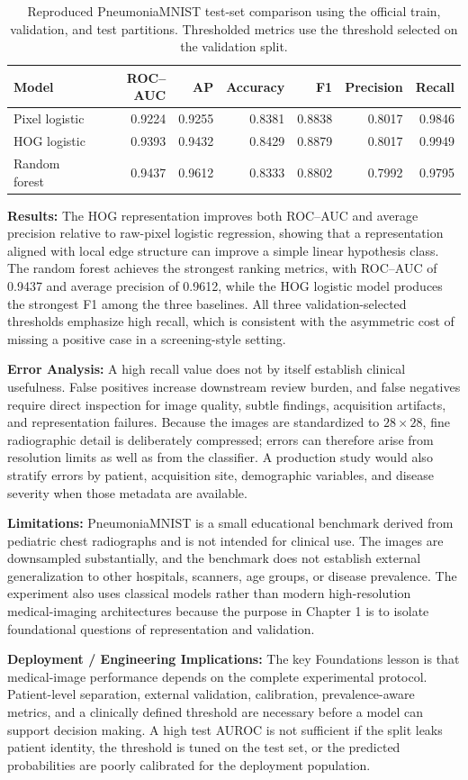 \begin{table}[t]
\centering
\small
\caption{Reproduced PneumoniaMNIST test-set comparison using the official train, validation, and test partitions. Thresholded metrics use the threshold selected on the validation split.}
\label{tab:ch1-medical-pneumonia-benchmark}
\begin{tabular}{lrrrrrr}
\toprule
Model & ROC--AUC & AP & Accuracy & F1 & Precision & Recall \\
\midrule
Pixel logistic & 0.9224 & 0.9255 & 0.8381 & 0.8838 & 0.8017 & 0.9846 \\
HOG logistic & 0.9393 & 0.9432 & 0.8429 & 0.8879 & 0.8017 & 0.9949 \\
Random forest & 0.9437 & 0.9612 & 0.8333 & 0.8802 & 0.7992 & 0.9795 \\
\bottomrule
\end{tabular}
\end{table}

\textbf{Results:} The HOG representation improves both ROC--AUC and average precision relative to raw-pixel logistic regression, showing that a representation aligned with local edge structure can improve a simple linear hypothesis class. The random forest achieves the strongest ranking metrics, with ROC--AUC of 0.9437 and average precision of 0.9612, while the HOG logistic model produces the strongest F1 among the three baselines. All three validation-selected thresholds emphasize high recall, which is consistent with the asymmetric cost of missing a positive case in a screening-style setting.

\textbf{Error Analysis:} A high recall value does not by itself establish clinical usefulness. False positives increase downstream review burden, and false negatives require direct inspection for image quality, subtle findings, acquisition artifacts, and representation failures. Because the images are standardized to \(28\times 28\), fine radiographic detail is deliberately compressed; errors can therefore arise from resolution limits as well as from the classifier. A production study would also stratify errors by patient, acquisition site, demographic variables, and disease severity when those metadata are available.

\textbf{Limitations:} PneumoniaMNIST is a small educational benchmark derived from pediatric chest radiographs and is not intended for clinical use. The images are downsampled substantially, and the benchmark does not establish external generalization to other hospitals, scanners, age groups, or disease prevalence. The experiment also uses classical models rather than modern high-resolution medical-imaging architectures because the purpose in Chapter 1 is to isolate foundational questions of representation and validation.

\textbf{Deployment / Engineering Implications:} The key Foundations lesson is that medical-image performance depends on the complete experimental protocol. Patient-level separation, external validation, calibration, prevalence-aware metrics, and a clinically defined threshold are necessary before a model can support decision making. A high test AUROC is not sufficient if the split leaks patient identity, the threshold is tuned on the test set, or the predicted probabilities are poorly calibrated for the deployment population.
